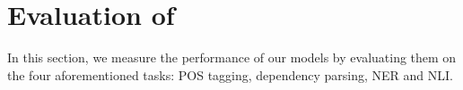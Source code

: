 \section{Evaluation of \camembert}


In this section, we measure the performance of our models by evaluating them on the four aforementioned tasks: POS tagging, dependency parsing, NER and NLI.







